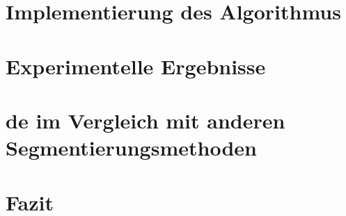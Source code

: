 \documentclass[10pt,a4paper,abstraction]{scrreprt}
\begin{document}
	\chapter{Implementierung des Algorithmus}
	\label{sec:imp}
	\chapter{Experimentelle Ergebnisse}
	\label{sec:ex}
	\chapter{\gls{de} im Vergleich mit anderen Segmentierungsmethoden}
	\label{sec:de-vergleich}
	\chapter{Fazit}
	\label{sec:sumary}
	\printglossaries




	
\end{document}

